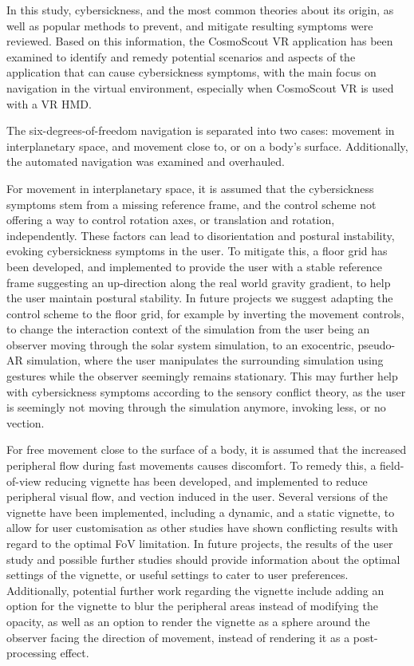 In this study, cybersickness, and the most common theories about its origin, as well as popular methods to prevent,
and mitigate resulting symptoms were reviewed.
Based on this information, the CosmoScout VR application has been examined to identify and remedy potential
scenarios and aspects of the application that can cause cybersickness symptoms, with the main focus on navigation in
the virtual environment, especially when CosmoScout VR is used with a VR HMD\@.

The six-degrees-of-freedom navigation is separated into two cases: movement in interplanetary space, and movement
close to, or on a body's surface.
Additionally, the automated navigation was examined and overhauled.

For movement in interplanetary space, it is assumed that the cybersickness symptoms stem from a missing reference
frame, and the control scheme not offering a way to control rotation axes, or translation and rotation, independently.
These factors can lead to disorientation and postural instability, evoking cybersickness symptoms in the user.
To mitigate this, a floor grid has been developed, and implemented to provide the user with a stable reference frame
suggesting an
up-direction along the real world gravity gradient, to help the user maintain postural stability.
In future projects we suggest adapting the control scheme to the floor grid, for example by inverting the movement
controls, to change the interaction context of the simulation from the user being an observer moving through the
solar system simulation, to an exocentric, pseudo-AR  simulation, where the user manipulates the surrounding
simulation using gestures while the observer seemingly remains stationary.
This may further help with cybersickness symptoms according to the sensory conflict theory, as the user is seemingly
not moving through the simulation anymore, invoking less, or no vection.

For free movement close to the surface of a body, it is assumed that the increased peripheral flow during fast
movements causes discomfort.
To remedy this, a field-of-view reducing vignette has been developed, and implemented to reduce peripheral visual flow,
and vection induced in the user.
Several versions of the vignette have been implemented, including a dynamic, and a static vignette, to allow for user
customisation as other studies have shown conflicting results with regard to the optimal FoV limitation.
In future projects, the results of the user study and possible further studies should provide information about the
optimal settings of the vignette, or useful settings to cater to user preferences.
Additionally, potential further work regarding the vignette include adding an option for the vignette to blur the
peripheral areas instead of modifying the opacity, as well as an option to render the vignette as a sphere around the
observer facing the direction of movement, instead of rendering it as a post-processing effect.

